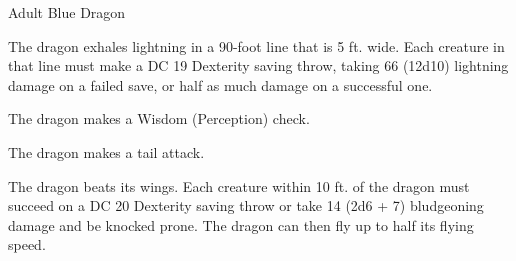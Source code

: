 \begin{monsterbox}{Adult Blue Dragon}
\begin{monsteraction}
The dragon exhales lightning in a 90-foot line that is 5 ft. wide. Each creature in that line must make a DC 19 Dexterity saving throw, taking 66 (12d10) lightning damage on a failed save, or half as much damage on a successful one.
\end{monsteraction}
\begin{monsteraction}[Detect]
The dragon makes a Wisdom (Perception) check.
\end{monsteraction}
\begin{monsteraction}
The dragon makes a tail attack.
\end{monsteraction}
\begin{monsteraction}
The dragon beats its wings. Each creature within 10 ft. of the dragon must succeed on a DC 20 Dexterity saving throw or take 14 (2d6 + 7) bludgeoning damage and be knocked prone. The dragon can then fly up to half its flying speed.
\end{monsteraction}
\end{monsterbox}